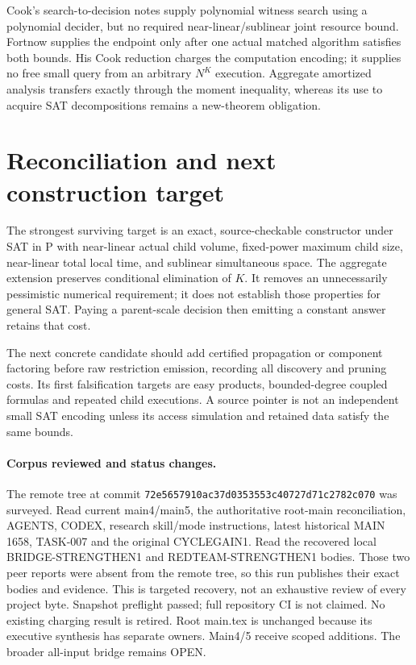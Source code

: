 \documentclass[11pt]{article}
\begin{document}
Cook's search-to-decision notes \cite{cook} supply polynomial witness
search using a polynomial decider, but no required near-linear/sublinear
joint resource bound. Fortnow \cite{fortnow} supplies the endpoint only
after one actual matched algorithm satisfies both bounds. His Cook
reduction charges the computation encoding; it supplies no free small
query from an arbitrary $N^K$ execution. Aggregate amortized analysis
transfers exactly through the moment inequality, whereas its use to
acquire SAT decompositions remains a new-theorem obligation.

\section{Reconciliation and next construction target}
The strongest surviving target is an exact, source-checkable constructor
under SAT in P with near-linear actual child volume, fixed-power maximum
child size, near-linear total local time, and sublinear simultaneous
space. The aggregate extension preserves conditional elimination of
$K$. It removes an unnecessarily pessimistic numerical requirement;
it does not establish those properties for general SAT. Paying a
parent-scale decision then emitting a constant answer retains that cost.

The next concrete candidate should add certified propagation or component
factoring before raw restriction emission, recording all discovery and
pruning costs. Its first falsification targets are easy products,
bounded-degree coupled formulas and repeated child executions. A source
pointer is not an independent small SAT encoding unless its access
simulation and retained data satisfy the same bounds.

\paragraph{Corpus reviewed and status changes.}
The remote tree at commit
\texttt{72e5657910ac37d0353553c40727d71c2782c070} was surveyed.
Read current main4/main5, the authoritative root-main reconciliation,
AGENTS, CODEX, research skill/mode instructions, latest historical MAIN
1658, TASK-007 and the original CYCLEGAIN1. Read the recovered local
BRIDGE-STRENGTHEN1 and REDTEAM-STRENGTHEN1 bodies. Those two peer reports
were absent from the remote tree, so this run publishes their exact
bodies and evidence. This is targeted recovery, not an exhaustive review
of every project byte. Snapshot preflight passed; full repository CI is
not claimed. No existing charging result is retired. Root main.tex is
unchanged because its executive synthesis has separate owners. Main4/5
receive scoped additions. The broader all-input bridge remains OPEN.
\end{document}

